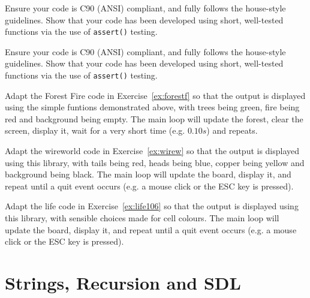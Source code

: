 




\noindent Ensure your code is C90 (ANSI) compliant, and fully follows the house-style guidelines.
Show that your code has been developed using short, well-tested functions via the use of \verb^assert()^ testing.



\noindent Ensure your code is C90 (ANSI) compliant, and fully follows the house-style guidelines.
Show that your code has been developed using short, well-tested functions via the use of \verb^assert()^ testing.





%



\begin{exercise}
Adapt the Forest Fire code in Exercise~\ref{ex:forestf} so that the output
is displayed using the simple funtions demonstrated above, with trees being green, fire being red and
background being empty.  The main loop will
update the forest, clear the screen, display it, wait for a very short time (e.g. $0.10s$) and repeats.
\end{exercise}



\begin{exercise}
Adapt the wireworld code in Exercise~\ref{ex:wirew} so that the output
is displayed using this library, with tails being red, heads being blue,
copper being yellow and background being black.  The main loop will
update the board, display it, and repeat until a quit event occurs
(e.g. a mouse click or the ESC key is pressed).  \end{exercise}

\begin{exercise}
Adapt the life code in Exercise~\ref{ex:life106} so that the output is
displayed using this library, with sensible choices made for cell colours.
The main loop will update the board, display it, and repeat until a quit
event occurs (e.g. a mouse click or the ESC key is pressed).
\end{exercise}

\chapter{Strings, Recursion and SDL}

